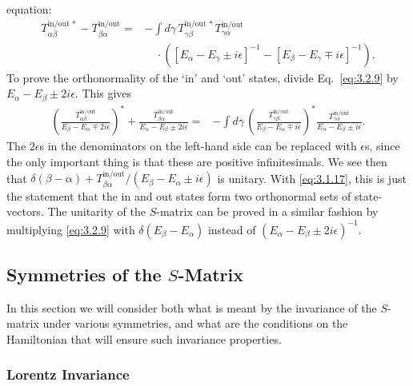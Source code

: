 
equation:
\begin{align}
T_{\alpha\beta}^{\mathrm{in/out}\,*}-T_{\beta\alpha}^{\mathrm{in/out}}
={}&-\int d\gamma\,T_{\gamma\beta}^{\mathrm{in/out}\,*}T_{\gamma\alpha}^{\mathrm{in/out}}
\nonumber\\
&\quad\cdot\left([E_\alpha-E_\gamma\pm i\epsilon]^{-1}
-[E_\beta-E_\gamma\mp i\epsilon]^{-1}\right).
\tag{3.2.9}\label{eq:3.2.9}
\end{align}
To prove the orthonormality of the `in' and `out' states, divide Eq.~\eqref{eq:3.2.9}
by $E_\alpha-E_\beta\pm2i\epsilon$. This gives
\begin{align*}
\left(\frac{T_{\alpha\beta}^{\mathrm{in/out}}}{E_\beta-E_\alpha\mp2i\epsilon}\right)^*
+\frac{T_{\beta\alpha}^{\mathrm{in/out}}}{E_\alpha-E_\beta\pm2i\epsilon}
={}&-\int d\gamma\,
\left(\frac{T_{\gamma\beta}^{\mathrm{in/out}}}{E_\beta-E_\alpha\mp i\epsilon}\right)^*
\frac{T_{\gamma\alpha}^{\mathrm{in/out}}}{E_\alpha-E_\beta\pm i\epsilon}.
\end{align*}
The $2\epsilon$s in the denominators on the left-hand side can be replaced with
$\epsilon$s, since the only important thing is that these are positive infinitesimals.
We see then that $\delta(\beta-\alpha)+T_{\beta\alpha}^{\mathrm{in/out}}/(E_\beta-E_\alpha
\pm i\epsilon)$ is unitary. With \eqref{eq:3.1.17}, this is just the statement that the
in and out states form two orthonormal sets of state-vectors. The unitarity of the
$S$-matrix can be proved in a similar fashion by multiplying \eqref{eq:3.2.9} with
$\delta(E_\beta-E_\alpha)$ instead of $(E_\alpha-E_\beta\pm2i\epsilon)^{-1}$.

\subsection{\texorpdfstring{Symmetries of the $S$-Matrix}{Symmetries of the S-Matrix}}

In this section we will consider both what is meant by the invariance of the
$S$-matrix under various symmetries, and what are the conditions on the Hamiltonian
that will ensure such invariance properties.

\subsubsection*{Lorentz Invariance}

